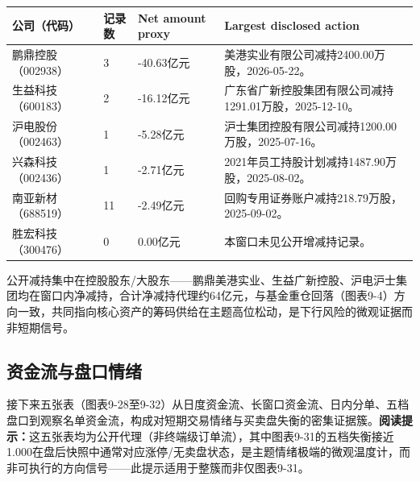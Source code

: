 \begin{exhibitbox}
\footnotesize
\begin{tabularx}{\textwidth}{L{1.8cm}R{1.5cm}R{1.8cm}X}
\toprule
\textbf{公司（代码）} & \textbf{记录数} & \textbf{Net amount proxy} & \textbf{Largest disclosed action} \\
\midrule
鹏鼎控股（002938） & 3 & -40.63亿元 & 美港实业有限公司减持2400.00万股，2026-05-22。 \\
生益科技（600183） & 2 & -16.12亿元 & 广东省广新控股集团有限公司减持1291.01万股，2025-12-10。 \\
沪电股份（002463） & 1 & -5.28亿元 & 沪士集团控股有限公司减持1200.00万股，2025-07-16。 \\
兴森科技（002436） & 1 & -2.71亿元 & 2021年员工持股计划减持1487.90万股，2025-08-02。 \\
南亚新材（688519） & 11 & -2.49亿元 & 回购专用证券账户减持218.79万股，2025-09-02。 \\
胜宏科技（300476） & 0 & 0.00亿元 & 本窗口未见公开增减持记录。 \\
\bottomrule
\end{tabularx}
\end{exhibitbox}

公开减持集中在控股股东/大股东——鹏鼎美港实业、生益广新控股、沪电沪士集团均在窗口内净减持，合计净减持代理约64亿元，与基金重仓回落（图表9-4）方向一致，共同指向核心资产的筹码供给在主题高位松动，是下行风险的微观证据而非短期信号。

\subsection*{资金流与盘口情绪}

接下来五张表（图表9-28至9-32）从日度资金流、长窗口资金流、日内分单、五档盘口到观察名单资金流，构成对短期交易情绪与买卖盘失衡的密集证据簇。\textbf{阅读提示：}这五张表均为公开代理（非终端级订单流），其中图表9-31的五档失衡接近1.000在盘后快照中通常对应涨停/无卖盘状态，是主题情绪极端的微观温度计，而非可执行的方向信号——此提示适用于整簇而非仅图表9-31。

